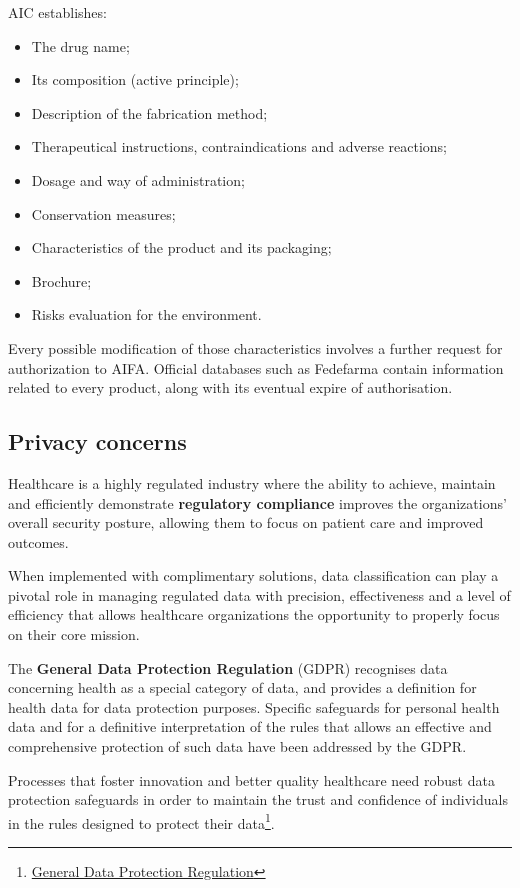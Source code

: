 AIC establishes:
\begin{itemize}
	\item The drug name;
	\item Its composition (active principle);
	\item Description of the fabrication method;
	\item Therapeutical instructions, contraindications and adverse reactions;
	\item Dosage and way of administration;
	 \item Conservation measures;
	 \item Characteristics of the product and its packaging;
	 \item Brochure;
	 \item Risks evaluation for the environment.
\end{itemize}

Every possible modification of those characteristics involves a further request for authorization to AIFA. Official databases such as Fedefarma contain information related to every product, along with its eventual expire of authorisation.

\subsection{Privacy concerns}
Healthcare is a highly regulated industry where the ability to achieve, maintain and efficiently demonstrate \textbf{regulatory compliance} improves the organizations' overall security posture, allowing them to focus on patient care and improved outcomes. 

When implemented with complimentary solutions, data classification can play a pivotal role in managing regulated data with precision, effectiveness and a level of efficiency that allows healthcare organizations the opportunity to properly focus on their core mission\cite{privacy}.

The \textbf{General Data Protection Regulation} (GDPR) recognises data concerning health as a special category of data, and provides a definition for health data for data protection purposes. Specific safeguards for personal health data and for a definitive interpretation of the rules that allows an effective and comprehensive protection of such data have been addressed by the GDPR. 

Processes that foster innovation and better quality healthcare need robust data protection safeguards in order to maintain the trust and confidence of individuals in the rules designed to protect their data\footnote{\href{https://gdpr-info.eu/}{General Data Protection Regulation}}.

